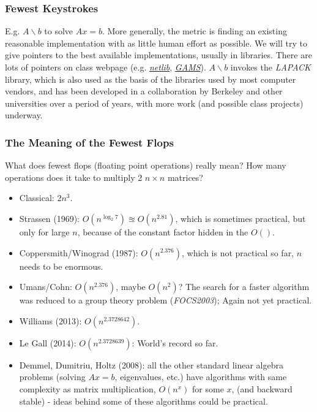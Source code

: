 \documentclass[11pt]{article}
\numberwithin{equation}{section}
\begin{document}
\subsubsection{Fewest Keystrokes}
E.g. $A\backslash b$ to solve $Ax=b$. More generally, the metric is finding an existing reasonable implementation with as little human effort as possible. 
We will try to give pointers to the best available implementations, usually in libraries. There are lots of pointers on class webpage 
(e.g. \href{http://www.netlib.org/}{\textit{netlib}}, \href{http://gams.nist.gov/}{\textit{GAMS}}).
$A\backslash b$ invokes the \textit{LAPACK} library, which is also used as the basis of the libraries used by most computer vendors, 
and has been  developed in a collaboration by Berkeley and other universities over a period of years, with more work (and possible class projects) underway.

\subsubsection{The Meaning of the Fewest Flops}
What does fewest flops (floating point operations) really mean? How many operations does it take to multiply 2 $n\times n$ matrices?
\begin{itemize}
    \item Classical: $2n^3$.
    \item Strassen (1969): $O(n^{\log_2 7}) \approxeq O(n^{2.81})$, which is sometimes practical, but only for large $n$, because of the constant factor hidden in the $O()$.
    \item Coppersmith/Winograd (1987): $O(n^{2.376})$, which is not practical so far, $n$ needs to be enormous.
    \item Umans/Cohn: $O(n^{2.376})$, maybe $O(n^2)$? The search for a faster algorithm was reduced to a group theory problem (\textit{FOCS2003}); Again not yet practical.
    \item Williams (2013): $O(n^{2.3728642})$.
    \item Le Gall (2014): $O(n^{2.3728639})$: World's record so far.
    \item Demmel, Dumitriu, Holtz (2008): all the other standard linear algebra problems (solving $Ax=b$, eigenvalues, etc.) 
    have algorithms with same complexity as matrix multiplication, $O(n^x)$ for some $x$, (and backward stable) - 
    ideas behind some of these algorithms could be practical.
\end{itemize} 
\end{document}
